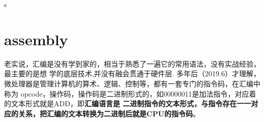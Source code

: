 s\chapter{assembly}
老实说，汇编是没有学到家的，相当于熟悉了一遍它的常用语法，没有实战经验，最主要的是想
学的底层技术,并没有融会贯通于硬件层.
\newline
多年后（2019.6）才理解，微处理器是管理计算机的算术、逻辑、控制等，都有一套专门的指令码，在汇编中称为
opcode，操作码，操作码是二进制形式的，如00000011是加法指令，对应着的文本形式就是ADD，即\textbf{汇编语言是
二进制指令的文本形式，与指令存在一一对应的关系，把汇编的文本转换为二进制后就是CPU的指令码}。

